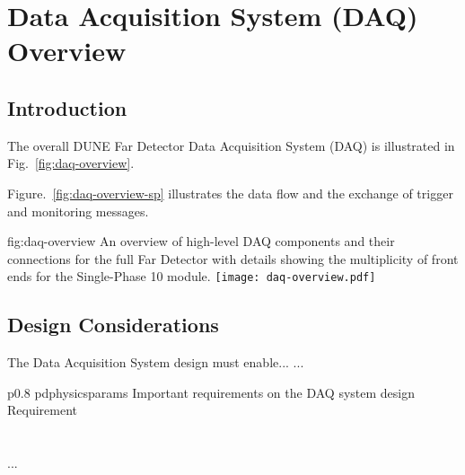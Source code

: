 \section{Data Acquisition System (DAQ) Overview}
\label{sec:fdsp-daq-ov}


\subsection{Introduction}
\label{sec:fdsp-daq-intro}

The overall DUNE Far Detector Data Acquisition System (DAQ) is
illustrated in Fig.~\ref{fig:daq-overview}.

Figure.~\ref{fig:daq-overview-sp} illustrates the data flow and the
exchange of trigger and monitoring messages.



\begin{dunefigure}{fig:daq-overview}
  {An overview of high-level DAQ components and their connections for the full Far Detector with details showing the multiplicity of front ends for the Single-Phase \SI{10}{\kton} module.}
\texttt{[image: daq-overview.pdf]}%
\end{dunefigure}



\subsection{Design Considerations}
\label{sec:fdsp-daq-des-consid}




The Data Acquisition System design must enable... 
...


\begin{dunetable}
{p{0.8\textwidth}}
{pdphysicsparams}
{Important requirements on the DAQ system design}   
Requirement  \\ \toprowrule
  \\ \colhline
   \\ \colhline
 ...\\ 
\end{dunetable}

